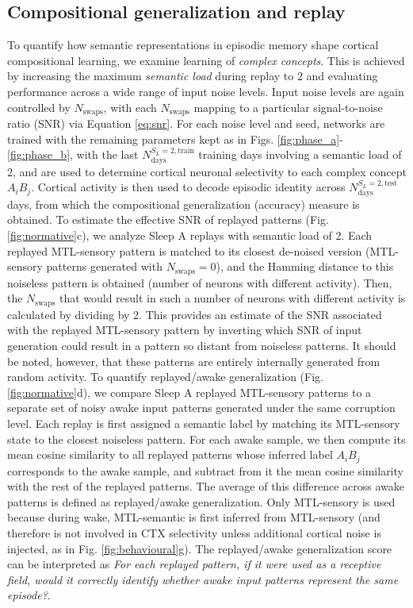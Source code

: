 \documentclass{article}
\begin{document}
\subsection*{Compositional generalization and replay}
To quantify how semantic representations in episodic memory shape cortical compositional learning, we examine learning of \textit{complex concepts}. This is achieved by increasing the maximum \textit{semantic load} during replay to 2 and evaluating performance across a wide range of input noise levels. Input noise levels are again controlled by $N_\textrm{swaps}$, with each $N_\textrm{swaps}$ mapping to a particular signal-to-noise ratio (SNR) via Equation \eqref{eq:snr}.
For each noise level and seed, networks are trained with the remaining parameters kept as in Figs. \ref{fig:phase_a}-\ref{fig:phase_b}, with the last $N^{S_L=2, \mathrm{train}}_\textrm{days}$ training days involving a semantic load of 2, and are used to determine cortical neuronal selectivity to each complex concept $A_iB_j$. Cortical activity is then used to decode episodic identity across $N^{S_L=2, \mathrm{test}}_\textrm{days}$ days, from which the compositional generalization (accuracy) measure is obtained.
\newline\newline
To estimate the effective SNR of replayed patterns (Fig. \ref{fig:normative}c), we analyze Sleep A replays with semantic load of 2. Each replayed MTL-sensory pattern is matched to its closest de-noised version (MTL-sensory patterns generated with $N_\textrm{swaps}=0$), and the Hamming distance to this noiseless pattern is obtained (number of neurons with different activity). Then, the $N_\textrm{swaps}$ that would result in such a number of neurons with different activity is calculated by dividing by 2. This provides an estimate of the SNR associated with the replayed MTL-sensory pattern by inverting which SNR of input generation could result in a pattern so distant from noiseless patterns. It should be noted, however, that these patterns are entirely internally generated from random activity.
\newline\newline
To quantify replayed/awake generalization (Fig. \ref{fig:normative}d), we compare Sleep A replayed MTL-sensory patterns to a separate set of noisy awake input patterns generated under the same corruption level. Each replay is first assigned a semantic label by matching its MTL-sensory state to the closest noiseless pattern. For each awake sample, we then compute its mean cosine similarity to all replayed patterns whose inferred label $A_iB_j$ corresponds to the awake sample, and subtract from it the mean cosine similarity with the rest of the replayed patterns. The average of this difference across awake patterns is defined as replayed/awake generalization. Only MTL-sensory is used because during wake, MTL-semantic is first inferred from MTL-sensory (and therefore is not involved in CTX selectivity unless additional cortical noise is injected, as in Fig. \ref{fig:behavioural}g). The replayed/awake generalization score can be interpreted as \textit{For each replayed pattern, if it were used as a receptive field, would it correctly identify whether awake input patterns represent the same episode?}.
\end{document}
